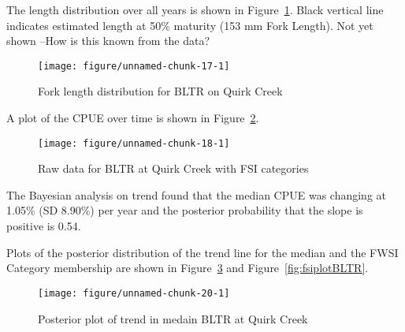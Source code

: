 \documentclass[]{article}\usepackage[]{graphicx}\usepackage[]{color}
\makeatletter
\def\maxwidth{ %
  \ifdim\Gin@nat@width>\linewidth
    \linewidth
  \else
    \Gin@nat@width
  \fi
}
\newenvironment{knitrout}{}{} %
\makeatother
\begin{document}
\clearpage
The length distribution over all years is shown in Figure~\ref{fig:ldistBLTR}.
Black vertical line indicates estimated length at 50\% maturity (153 mm Fork Length).
{\Large Not yet shown --How is this known from the data? }


\begin{figure}[h]
\begin{center}
\begin{knitrout}
\color{fgcolor}
\texttt{[image: figure/unnamed-chunk-17-1]} 

\end{knitrout}
\end{center}
\caption{Fork length distribution for BLTR on Quirk Creek}
\label{fig:ldistBLTR}
\end{figure}


A plot of the CPUE over time is shown in Figure~\ref{fig:rawtrendBLTR}.

\begin{figure}[h]
\begin{center}
\begin{knitrout}
\color{fgcolor}
\texttt{[image: figure/unnamed-chunk-18-1]} 

\end{knitrout}
\end{center}
\caption{Raw data for BLTR at Quirk Creek with FSI categories}
\label{fig:rawtrendBLTR}
\end{figure}




The Bayesian analysis on trend found that the median CPUE was changing at 
 1.05\% (SD  8.90\%) per year
and the posterior probability that the slope is positive is  0.54.

Plots of the posterior distribution of the trend line for the median and the FWSI Category membership are shown in 
Figure~\ref{fig:postplotBLTR} and
Figure~\ref{fig:fsiplotBLTR}.

\begin{figure}[h]
\begin{center}
\begin{knitrout}
\color{fgcolor}
\texttt{[image: figure/unnamed-chunk-20-1]} 

\end{knitrout}
\end{center}
\caption{Posterior plot of trend in medain BLTR at Quirk Creek}
\label{fig:postplotBLTR}
\end{figure}
\end{document}
